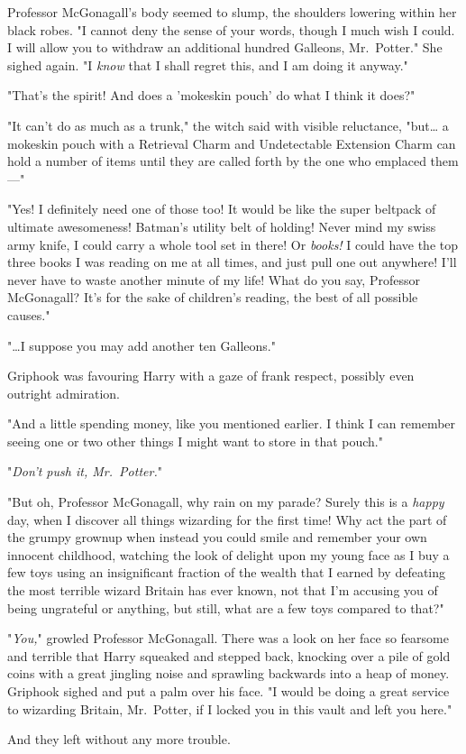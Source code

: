Professor McGonagall's body seemed to slump, the shoulders lowering within her 
black robes. "I cannot deny the sense of your words, though I much wish I 
could. I will allow you to withdraw an additional hundred Galleons, 
Mr.~Potter." She sighed again. "I \emph{know} that I shall regret this, and I 
am doing it anyway."

"That's the spirit! And does a 'mokeskin pouch' do what I think it does?"

"It can't do as much as a trunk," the witch said with visible reluctance, 
"but{\ldots} a mokeskin pouch with a Retrieval Charm and Undetectable Extension 
Charm can hold a number of items until they are called forth by the one who 
emplaced them---"

"Yes! I definitely need one of those too! It would be like the super beltpack 
of ultimate awesomeness! Batman's utility belt of holding! Never mind my swiss 
army knife, I could carry a whole tool set in there! Or \emph{books!} I could 
have the top three books I was reading on me at all times, and just pull one 
out anywhere! I'll never have to waste another minute of my life! What do you 
say, Professor McGonagall? It's for the sake of children's reading, the best of 
all possible causes."

"{\ldots}I suppose you may add another ten Galleons."

Griphook was favouring Harry with a gaze of frank respect, possibly even 
outright admiration.

"And a little spending money, like you mentioned earlier. I think I can 
remember seeing one or two other things I might want to store in that pouch."

"\emph{Don't push it, Mr.~Potter.}"

"But oh, Professor McGonagall, why rain on my parade? Surely this is a 
\emph{happy} day, when I discover all things wizarding for the first time! Why 
act the part of the grumpy grownup when instead you could smile and remember 
your own innocent childhood, watching the look of delight upon my young face as 
I buy a few toys using an insignificant fraction of the wealth that I earned by 
defeating the most terrible wizard Britain has ever known, not that I'm 
accusing you of being ungrateful or anything, but still, what are a few toys 
compared to that?"

"\emph{You,}" growled Professor McGonagall. There was a look on her face so 
fearsome and terrible that Harry squeaked and stepped back, knocking over a 
pile of gold coins with a great jingling noise and sprawling backwards into a 
heap of money. Griphook sighed and put a palm over his face. "I would be doing 
a great service to wizarding Britain, Mr.~Potter, if I locked you in this vault 
and left you here."

And they left without any more trouble.
